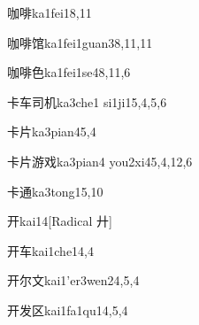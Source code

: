 
\begin{verbete}{咖啡}{ka1fei1}{8,11}
\end{verbete}

\begin{verbete}{咖啡馆}{ka1fei1guan3}{8,11,11}
\end{verbete}

\begin{verbete}{咖啡色}{ka1fei1se4}{8,11,6}
\end{verbete}

\begin{verbete}{卡车司机}{ka3che1 si1ji1}{5,4,5,6}
\end{verbete}

\begin{verbete}{卡片}{ka3pian4}{5,4}
\end{verbete}

\begin{verbete}{卡片游戏}{ka3pian4 you2xi4}{5,4,12,6}
\end{verbete}

\begin{verbete}{卡通}{ka3tong1}{5,10}
\end{verbete}

\begin{verbete}{开}{kai1}{4}[Radical 廾]
\end{verbete}

\begin{verbete}{开车}{kai1che1}{4,4}
\end{verbete}

\begin{verbete}{开尔文}{kai1'er3wen2}{4,5,4}
\end{verbete}

\begin{verbete}{开发区}{kai1fa1qu1}{4,5,4}
\end{verbete}

